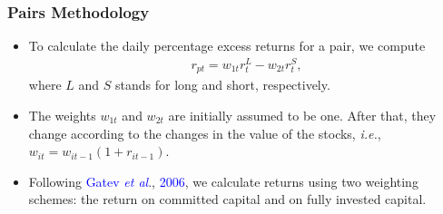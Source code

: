 \documentclass[pdf,9pt,xcolor=dvipsnames,hide notes]{beamer}
\begin{document}
\begin{frame}[label=frame3]
	\frametitle{Pairs Methodology}
	
	\begin{itemize}
		\justifying
		\item To calculate the daily percentage excess returns for a pair, we compute
		\begin{equation}
		\begin{aligned}
		r_{pt}=w_{1t}r_{t}^{L}-w_{2t}r_{t}^{S},
		\end{aligned}
		\label{eq:eq01}
		\end{equation}
		where $L$ and $S$ stands for long and short, respectively. 
		
		\vspace{0.3cm}
		
		\item The weights $w_{1t}$ and $w_{2t}$ are initially assumed to be one. After that, they change according to the changes in the value of the stocks, \emph{i.e.}, $w_{it}=w_{it-1}(1+r_{it-1})$.
		
		\vspace{0.3cm}
		
		\item Following \textcolor{blue}{Gatev \emph{et al}}., \textcolor{blue}{2006}, we calculate returns using two weighting schemes: the return on committed capital and on fully invested capital. 
	
	\end{itemize}
	
\end{frame}
\end{document}
